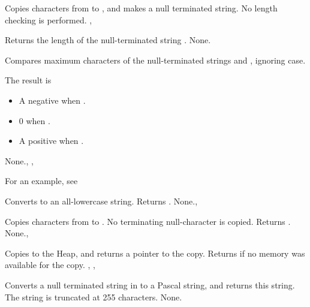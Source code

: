 

{
Copies  characters from  to , and makes
 a null terminated string. 
}
{No length checking is performed.}
{, }
 


{
Returns the length of the null-terminated string .
}
{None.}{}



{
Compares maximum  characters of the null-terminated strings  
and , ignoring case.

The result is 
\begin{itemize}
\item A negative  when .
\item 0 when .
\item A positive  when .
\end{itemize}
}
{None.}{, , }

For an example, see 

{
Converts  to an all-lowercase string. Returns .
}
{None.}{, }



{
Copies  characters from  to . No
terminating null-character is copied.
Returns .
}
{None.}{, }



{
Copies  to the Heap, and returns a pointer to the copy.
}
{Returns  if no memory was available for the copy.}
{, , }



{
Converts a null terminated string in  to a Pascal string, and returns
this string. The string is truncated at 255 characters.
}
{None.}{ }



